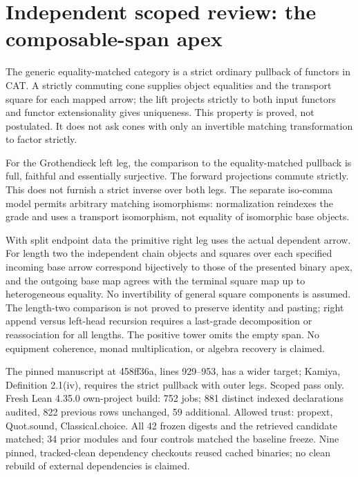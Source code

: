 \documentclass{article}
\begin{document}
\section*{Independent scoped review: the composable-span apex}
The generic equality-matched category is a strict ordinary pullback of functors in CAT. A strictly commuting cone supplies object equalities and the transport square for each mapped arrow; the lift projects strictly to both input functors and functor extensionality gives uniqueness. This property is proved, not postulated. It does not ask cones with only an invertible matching transformation to factor strictly.
\par For the Grothendieck left leg, the comparison to the equality-matched pullback is full, faithful and essentially surjective. The forward projections commute strictly. This does not furnish a strict inverse over both legs. The separate iso-comma model permits arbitrary matching isomorphisms: normalization reindexes the grade and uses a transport isomorphism, not equality of isomorphic base objects.
\par With split endpoint data the primitive right leg uses the actual dependent arrow. For length two the independent chain objects and squares over each specified incoming base arrow correspond bijectively to those of the presented binary apex, and the outgoing base map agrees with the terminal square map up to heterogeneous equality. No invertibility of general square components is assumed. The length-two comparison is not proved to preserve identity and pasting; right append versus left-head recursion requires a last-grade decomposition or reassociation for all lengths. The positive tower omits the empty span. No equipment coherence, monad multiplication, or algebra recovery is claimed.
\par The pinned manuscript at 458ff36a, lines 929--953, has a wider target; Kamiya, Definition 2.1(iv), requires the strict pullback with outer legs. Scoped pass only. Fresh Lean 4.35.0 own-project build: 752 jobs; 881 distinct indexed declarations audited, 822 previous rows unchanged, 59 additional. Allowed trust: propext, Quot.sound, Classical.choice. All 42 frozen digests and the retrieved candidate matched; 34 prior modules and four controls matched the baseline freeze. Nine pinned, tracked-clean dependency checkouts reused cached binaries; no clean rebuild of external dependencies is claimed.
\end{document}
